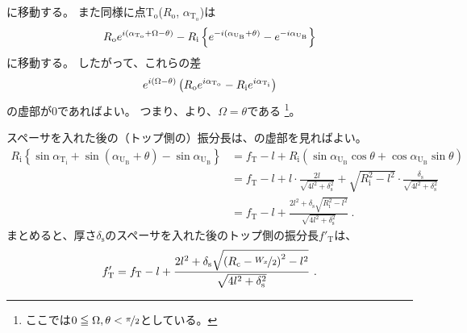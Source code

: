 に移動する。
また同様に点T$_\mathrm o$($R_\mathrm o$, $\alpha_{\mathrm T_\mathrm o}$)は
\begin{align*}
  \notag
  R_\mathrm oe^{i(\alpha_{\mathrm T_\mathrm o} + \Omega - \theta)}
  -R_\mathrm i\left\{e^{-i(\alpha_{\mathrm U_\mathrm B} + \theta)}-e^{-i\alpha_{\mathrm U_\mathrm B}}\right\}
\end{align*}
に移動する。
したがって、これらの差
\begin{align*}
  \notag
  e^{i(\Omega - \theta)}\left(R_\mathrm oe^{i\alpha_{\mathrm T_\mathrm o}} - R_\mathrm ie^{i\alpha_{\mathrm T_\mathrm i}}\right)
\end{align*}
の虚部が$0$であればよい。
つまり、より、$\Omega = \theta$である
\footnote{ここでは$0 \leqq \Omega, \theta < \nicefrac \pi2$としている。}。

スペーサを入れた後の（トップ側の）振分長は、の虚部を見ればよい。
\begin{align*}
  R_\mathrm i\left\{\sin\alpha_{\mathrm T_\mathrm i} + \sin(\alpha_{\mathrm U_\mathrm B} + \theta) - \sin\alpha_{\mathrm U_\mathrm B}\right\}
  &= f_\mathrm T -l
     +R_\mathrm i\left(\sin\alpha_{\mathrm U_\mathrm B}\cos\theta + \cos\alpha_{\mathrm U_\mathrm B}\sin\theta\right)\\
  &= f_\mathrm T -l+l\cdot\frac{2l}{\sqrt{4l^2+\delta_\mathrm s^2}}
     +\sqrt{R_\mathrm i^2-l^2}\cdot\frac{\delta_\mathrm s}{\sqrt{4l^2+\delta_\mathrm s^2}}\\
  &= f_\mathrm T -l+\frac{2l^2+\delta_\mathrm s\sqrt{R_\mathrm i^2-l^2}}{\sqrt{4l^2+\delta_\mathrm s^2}}~.
\end{align*}
まとめると、厚さ$\delta_\mathrm s$のスペーサを入れた後のトップ側の振分長$f'_\mathrm T$は、
\begin{align*}
  f'_\mathrm T
  = f_\mathrm T -l
    +\frac{2l^2+\delta_\mathrm s\sqrt{\left(R_\mathrm c-\nicefrac{W_x}2\right)^2-l^2}}{\sqrt{4l^2+\delta_\mathrm s^2}}~.
\end{align*}



